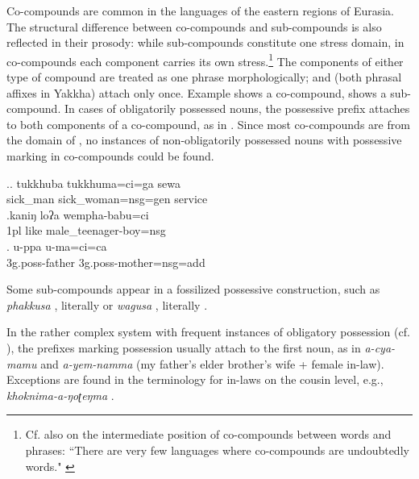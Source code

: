 Co-compounds are common in the languages of the eastern regions of Eurasia. The structural difference between co-compounds and sub-compounds is also reflected in their prosody: while sub-compounds constitute one stress domain, in co-compounds each component carries its own stress.\footnote{Cf. also \citet{Waelchli2005_Co-compounds} on the intermediate position of co-compounds between words and phrases: “There are very few languages where co-compounds are undoubtedly words." \cite[3]{Waelchli2005_Co-compounds}} The components of either type of compound are treated as one phrase morphologically;  and (both phrasal affixes in Yakkha) attach only once. Example \Next[a] shows a co-compound, \Next[b] shows a sub-compound.  In cases of obligatorily possessed nouns, the possessive prefix attaches to both components of a co-compound, as in \Next[c]. Since most co-compounds are from the domain of , no instances of non-obligatorily possessed nouns with possessive marking in co-compounds  could be found. 


 \ex.\ag. tukkhuba tukkhuma=ci=ga   sewa\\ 
sick\_man sick\_woman{\sc =nsg=gen} service\\
 \bg.kaniŋ loʔa wempha-babu=ci\\
 {\sc 1pl} like male\_teenager-boy{\sc =nsg}\\
  
\bg.  u-ppa u-ma=ci=ca\\
{\sc 3g.poss-}father {\sc 3g.poss-}mother{\sc =nsg=add}\\
 

Some sub-compounds appear in a fossilized possessive construction, such as \emph{phak\-kusa} , literally  or \emph{wagusa} , literally .

 In the rather complex  system with frequent instances of obligatory possession (cf. ), the prefixes marking possession usually attach to the first noun, as in  \emph{a-cya-mamu}  and  \emph{a-yem-namma}  (my father's elder brother's wife + female in-law). Exceptions are found in the terminology for in-laws on the cousin level, e.g., \emph{khoknima-a-ŋoʈeŋma} .
 
